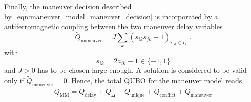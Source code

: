 Finally, the maneuver decision described by~\eqref{eqn:maneuver_model_maneuver_decision} is incorporated by a antiferromagnetic coupling between the two maneuver delay variables
\begin{equation*}
  \tilde Q_\text{maneuver} = J \sum_k  {\left( s_{ik} s_{jk} + 1\right)}_{i, j \in I_k} \; .
\end{equation*}
with 
\begin{equation*}
    s_{ik} = 2 a_{ik} - 1 \in \{-1, 1\}
\end{equation*}
and $J>0$ has to be chosen large enough. 
A solution is considered to be valid only if $\tilde Q_\text{maneuver} = 0$.
Hence, the total QUBO for the maneuver model reads
\begin{equation*}
    Q_\text{MM} = \tilde Q_\text{delay} + \tilde Q_\Delta  + \tilde Q_\text{unique} + \tilde Q_\text{conflict} + \tilde Q_\text{maneuver} 
\end{equation*}
